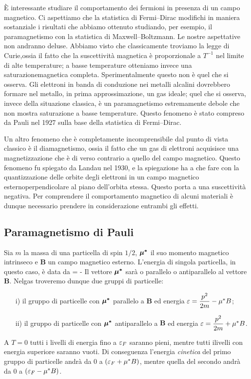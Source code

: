 È interessante studiare il comportamento dei fermioni in presenza di un campo
magnetico. Ci aspettiamo che la statistica di Fermi--Dirac modifichi in maniera
sostanziale i risultati che abbiamo ottenuto studiando, per esempio, il
paramagnetismo con la statistica di Maxwell--Boltzmann. Le nostre aspettative
non andranno deluse. Abbiamo visto che classicamente troviamo la legge di
Curie,ossia il fatto che la suscettività magnetica è proporzionale a $T^{-1}$
nel
limite di alte temperature; a basse temperature otteniamo invece una
saturazionemagnetica completa. Sperimentalmente questo non è quel che si
osserva. Gli
elettroni in banda di conduzione nei metalli alcalini dovrebbero formare nel
metallo, in prima approssimazione, un gas ideale; quel che si osserva, invece
della situazione classica, è un paramagnetismo estremamente debole che non
mostra saturazione a basse temperature. Questo fenomeno è stato compreso da
Pauli nel 1927 sulla base della statistica di Fermi--Dirac.

Un altro fenomeno che è completamente incomprensibile dal punto di vista
classico è il diamagnetismo, ossia il fatto che un gas di elettroni acquisisce
una magnetizzazione che è di verso contrario a quello del campo magnetico.
Questo fenomeno fu spiegato da Landau nel 1930, e la spiegazione ha a che fare
con la quantizzazione delle orbite degli elettroni in un campo magnetico
esternoperpendicolare al piano dell'orbita stessa. Questo porta a una
suscettività
negativa. Per comprendere il comportamento magnetico di alcuni materiali è
dunque necessario prendere in considerazione entrambi gli effetti.

\subsection{Paramagnetismo di Pauli}

Sia $m$ la massa di una particella di spin $1/2$, $\boldsymbol{\mu^*}$ il suo momento
magnetico intrinseco e $\mathbf{B}$ un campo magnetico esterno. L'energia di
singola particella, in questo caso, è data da
\be
\eps =  - \musb \cdot {}
\ee
Il vettore $\boldsymbol{\mu^*}$ sarà o parallelo o antiparallelo al vettore $\mathbf{B}$.
Nelgas troveremo dunque due gruppi di particelle:
\begin{enumerate}
\item[i)] il gruppo di particelle con $\boldsymbol{\mu^*}$ parallelo a $\mathbf{B}$ ed
energia $\varepsilon = \dfrac{p^2}{2m} - \mu^*B$;
\item[ii)] il gruppo di particelle con $\boldsymbol{\mu^*}$ antiparallelo a $\mathbf{B}$ ed
energia $\varepsilon = \dfrac{p^2}{2m} + \mu^*B$.
\end{enumerate}
A $T=0$ tutti i livelli di energia fino a $\varepsilon_F$ saranno pieni, mentre tutti
ilivelli con energia superiore saranno vuoti. Di conseguenza l'energia {\em
cinetica} del primo gruppo di particelle andrà da $0$ a $(\varepsilon_F + \mu^*B)$,
mentre quella del secondo andrà da $0$ a $(\varepsilon_F - \mu^*B)$.

